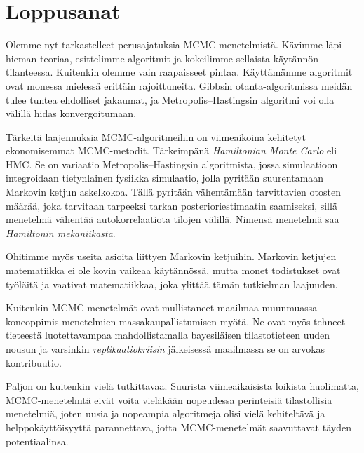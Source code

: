 \chapter{Loppusanat}

Olemme nyt tarkastelleet perusajatuksia MCMC-menetelmistä. Kävimme läpi hieman teoriaa, esittelimme algoritmit ja kokeilimme sellaista käytännön tilanteessa. Kuitenkin olemme vain raapaisseet pintaa. Käyttämämme algoritmit ovat monessa mielessä erittäin rajoittuneita. Gibbsin otanta-algoritmissa meidän tulee tuntea ehdolliset jakaumat, ja Metropolis--Hastingsin algoritmi voi olla välillä hidas konvergoitumaan.

Tärkeitä laajennuksia MCMC-algoritmeihin on viimeaikoina kehitetyt ekonomisemmat MCMC-metodit. Tärkeimpänä \textit{Hamiltonian Monte Carlo} eli HMC. Se on variaatio Metropolis--Hastingsin algoritmista, jossa simulaatioon integroidaan tietynlainen fysiikka simulaatio, jolla pyritään suurentamaan Markovin ketjun askelkokoa. Tällä pyritään vähentämään tarvittavien otosten määrää, joka tarvitaan tarpeeksi tarkan posterioriestimaatin saamiseksi, sillä menetelmä vähentää autokorrelaatiota tilojen välillä. Nimensä menetelmä saa \emph{Hamiltonin mekaniikasta}.

Ohitimme myös useita asioita liittyen Markovin ketjuihin. Markovin ketjujen matematiikka ei ole kovin vaikeaa käytännössä, mutta monet todistukset ovat työläitä ja vaativat matematiikkaa, joka ylittää tämän tutkielman laajuuden.

Kuitenkin MCMC-menetelmät ovat mullistaneet maailmaa muunmuassa koneoppimis menetelmien massakaupallistumisen myötä. Ne ovat myös tehneet tieteestä luotettavampaa mahdollistamalla bayesiläisen tilastotieteen uuden nousun ja varsinkin \emph{replikaatiokriisin} jälkeisessä maailmassa se on arvokas kontribuutio.

Paljon on kuitenkin vielä tutkittavaa. Suurista viimeaikaisista loikista huolimatta, MCMC-menetelmtä eivät voita vieläkään nopeudessa perinteisiä tilastollisia menetelmiä, joten uusia ja nopeampia algoritmeja olisi vielä kehiteltävä ja helppokäyttöisyyttä parannettava, jotta MCMC-menetelmät saavuttavat täyden potentiaalinsa.